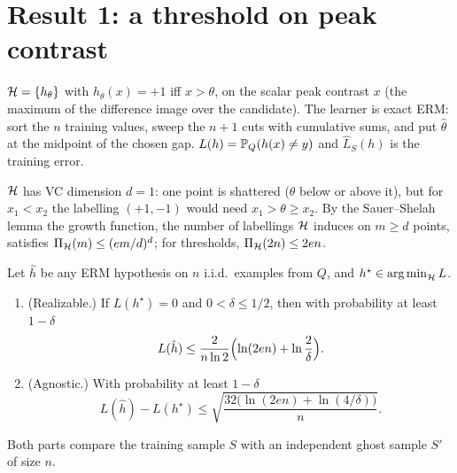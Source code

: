 \section{Result 1: a threshold on peak contrast}
\label{sec:result-1}

$\cH=\{h_\theta\}$ with $h_\theta(x)=+1$ iff $x>\theta$, on the scalar peak contrast $x$ (the
maximum of the difference image over the candidate). The learner is exact ERM: sort the $n$
training values, sweep the $n+1$ cuts with cumulative sums, and put $\hat\theta$ at the midpoint
of the chosen gap. $L(h)=\P_Q(h(x)\ne y)$ and $\hat L_S(h)$ is the training error.

$\cH$ has VC dimension $d=1$: one point is shattered ($\theta$ below or above it), but for
$x_1<x_2$ the labelling $(+1,-1)$ would need $x_1>\theta\ge x_2$. By the Sauer--Shelah lemma the
growth function, the number of labellings $\cH$ induces on $m\ge d$ points, satisfies
$\Pi_\cH(m)\le(em/d)^d$; for thresholds, $\Pi_\cH(2n)\le2en$.

\begin{theorem}[Result 1]
\label{thm:1}
Let $\hat h$ be any ERM hypothesis on $n$ i.i.d.\ examples from $Q$, and $h^\star\in\argmin_\cH L$.
\begin{enumerate}[label=(\roman*)]
  \item (Realizable.) If $L(h^\star)=0$ and $0<\delta\le1/2$, then with probability at least
  $1-\delta$
  \[ L(\hat h)\le\frac{2}{n\ln 2}\Bigl(\ln(2en)+\ln\frac2\delta\Bigr). \]
  \item (Agnostic.) With probability at least $1-\delta$
  \[ L(\hat h)-L(h^\star)\le\sqrt{\frac{32\bigl(\ln(2en)+\ln(4/\delta)\bigr)}{n}}. \]
\end{enumerate}
\end{theorem}

Both parts compare the training sample $S$ with an independent ghost sample $S'$ of size $n$.

